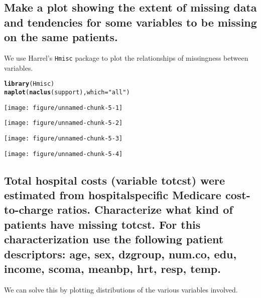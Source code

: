 \documentclass[headinclude=true, headsepline=true, DIV14]{scrartcl}\usepackage[]{graphicx}\usepackage[]{color}
\makeatletter
\def\maxwidth{ %
  \ifdim\Gin@nat@width>\linewidth
    \linewidth
  \else
    \Gin@nat@width
  \fi
}
\newcommand{\hlstr}[1]{\textcolor[rgb]{0.192,0.494,0.8}{#1}}%
\newcommand{\hlstd}[1]{\textcolor[rgb]{0.345,0.345,0.345}{#1}}%
\newcommand{\hlkwc}[1]{\textcolor[rgb]{0.333,0.667,0.333}{#1}}%
\newcommand{\hlkwd}[1]{\textcolor[rgb]{0.737,0.353,0.396}{\textbf{#1}}}%
\newenvironment{kframe}{%
 \def\at@end@of@kframe{}%
 \ifinner\ifhmode%
  \def\at@end@of@kframe{\end{minipage}}%
  \begin{minipage}{\columnwidth}%
 \fi\fi%
 \def\FrameCommand##1{\hskip\@totalleftmargin \hskip-\fboxsep
 \colorbox{shadecolor}{##1}\hskip-\fboxsep
     \hskip-\linewidth \hskip-\@totalleftmargin \hskip\columnwidth}%
 \MakeFramed {\advance\hsize-\width
   \@totalleftmargin\z@ \linewidth\hsize
   \@setminipage}}%
 {\par\unskip\endMakeFramed%
 \at@end@of@kframe}
\newenvironment{knitrout}{}{} %
\makeatother
\begin{document}
\subsection{Make a plot showing the extent of missing data and tendencies for some
variables to be missing on the same patients.}

We use Harrel's \texttt{Hmisc} package to plot the relationships of
missingness between variables.

\begin{knitrout}
\color{fgcolor}\begin{kframe}
\begin{alltt}
\hlkwd{library}\hlstd{(Hmisc)}
\hlkwd{naplot}\hlstd{(}\hlkwd{naclus}\hlstd{(support),} \hlkwc{which} \hlstd{=} \hlstr{"all"}\hlstd{)}
\end{alltt}
\end{kframe}

{\centering \texttt{[image: figure/unnamed-chunk-5-1]} 

}




{\centering \texttt{[image: figure/unnamed-chunk-5-2]} 

}




{\centering \texttt{[image: figure/unnamed-chunk-5-3]} 

}




{\centering \texttt{[image: figure/unnamed-chunk-5-4]} 

}



\end{knitrout}

\subsection{Total hospital costs (variable totcst) were estimated from 
hospitalspecific Medicare cost-to-charge ratios. Characterize what kind of
patients have missing totcst. For this characterization use the following
patient descriptors: age, sex, dzgroup, num.co, edu, income, scoma,
meanbp, hrt, resp, temp.}

We can solve this by plotting distributions of the various variables involved.
\end{document}
